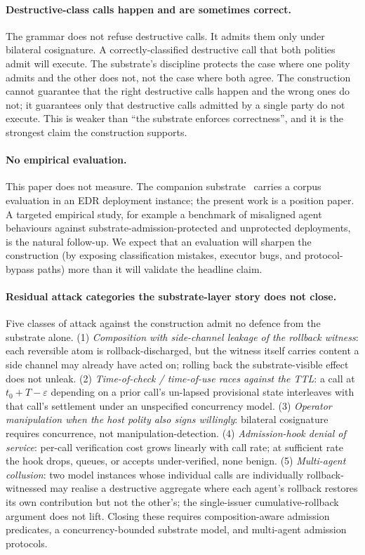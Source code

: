 \paragraph{Destructive-class calls happen and are sometimes correct.}
The grammar does not refuse destructive calls. It admits them only under bilateral cosignature. A correctly-classified destructive call that both polities admit will execute. The substrate's discipline protects the case where one polity admits and the other does not, not the case where both agree. The construction cannot guarantee that the right destructive calls happen and the wrong ones do not; it guarantees only that destructive calls admitted by a single party do not execute. This is weaker than ``the substrate enforces correctness'', and it is the strongest claim the construction supports.

\paragraph{No empirical evaluation.}
This paper does not measure. The companion substrate~\cite{programmableSovereignty2026} carries a corpus evaluation in an EDR deployment instance; the present work is a position paper. A targeted empirical study, for example a benchmark of misaligned agent behaviours against substrate-admission-protected and unprotected deployments, is the natural follow-up. We expect that an evaluation will sharpen the construction (by exposing classification mistakes, executor bugs, and protocol-bypass paths) more than it will validate the headline claim.

\paragraph{Residual attack categories the substrate-layer story does not close.}
Five classes of attack against the construction admit no defence from the substrate alone. (1) \emph{Composition with side-channel leakage of the rollback witness}: each reversible atom is rollback-discharged, but the witness itself carries content a side channel may already have acted on; rolling back the substrate-visible effect does not unleak. (2) \emph{Time-of-check / time-of-use races against the TTL}: a call at $t_0 + T - \varepsilon$ depending on a prior call's un-lapsed provisional state interleaves with that call's settlement under an unspecified concurrency model. (3) \emph{Operator manipulation when the host polity also signs willingly}: bilateral cosignature requires concurrence, not manipulation-detection. (4) \emph{Admission-hook denial of service}: per-call verification cost grows linearly with call rate; at sufficient rate the hook drops, queues, or accepts under-verified, none benign. (5) \emph{Multi-agent collusion}: two model instances whose individual calls are individually rollback-witnessed may realise a destructive aggregate where each agent's rollback restores its own contribution but not the other's; the single-issuer cumulative-rollback argument does not lift. Closing these requires composition-aware admission predicates, a concurrency-bounded substrate model, and multi-agent admission protocols.

